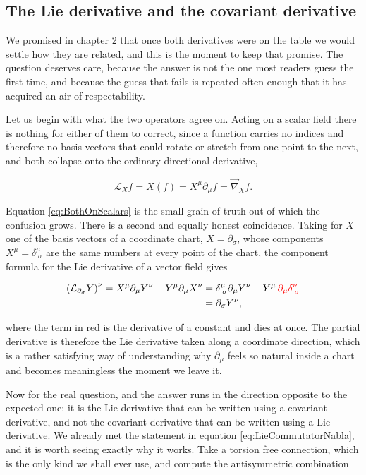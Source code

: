     \subsection{The Lie derivative and the covariant derivative}

        We promised in chapter 2 that once both derivatives were on the table we would settle how they are related, and this is the moment to keep that promise. The question deserves care, because the answer is not the one most readers guess the first time, and because the guess that fails is repeated often enough that it has acquired an air of respectability.

        Let us begin with what the two operators agree on. Acting on a scalar field there is nothing for either of them to correct, since a function carries no indices and therefore no basis vectors that could rotate or stretch from one point to the next, and both collapse onto the ordinary directional derivative,

        \begin{equation}\label{eq:BothOnScalars}
            \mathcal{L}_Xf = X(f) = X^{\mu}\partial_{\mu}f = \Vec{\nabla}_Xf.
        \end{equation}

        Equation \ref{eq:BothOnScalars} is the small grain of truth out of which the confusion grows. There is a second and equally honest coincidence. Taking for $X$ one of the basis vectors of a coordinate chart, $X=\partial_{\sigma}$, whose components $X^{\mu}=\delta^{\mu}_{\;\sigma}$ are the same numbers at every point of the chart, the component formula for the Lie derivative of a vector field gives

        \begin{align*}
            \left(\mathcal{L}_{\partial_{\sigma}}Y\right)^{\nu} = X^{\mu}\partial_{\mu}Y^{\nu} - Y^{\mu}\partial_{\mu}X^{\nu} &= \delta^{\mu}_{\;\sigma}\partial_{\mu}Y^{\nu} - Y^{\mu}\,{\color{red}\partial_{\mu}\delta^{\nu}_{\;\sigma}}\\
            &= \partial_{\sigma}Y^{\nu},
        \end{align*}

        where the term in red is the derivative of a constant and dies at once. The partial derivative is therefore the Lie derivative taken along a coordinate direction, which is a rather satisfying way of understanding why $\partial_{\mu}$ feels so natural inside a chart and becomes meaningless the moment we leave it.

        Now for the real question, and the answer runs in the direction opposite to the expected one: it is the Lie derivative that can be written using a covariant derivative, and not the covariant derivative that can be written using a Lie derivative. We already met the statement in equation \ref{eq:LieCommutatorNabla}, and it is worth seeing exactly why it works. Take a torsion free connection, which is the only kind we shall ever use, and compute the antisymmetric combination

